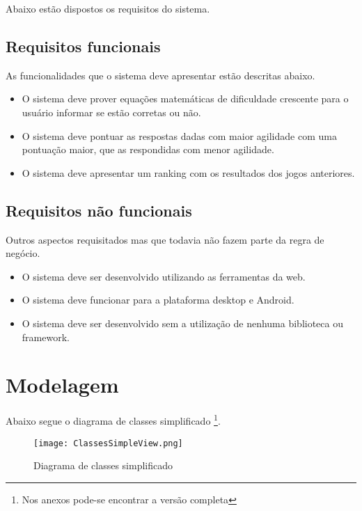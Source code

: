 Abaixo estão dispostos os requisitos do sistema.

\subsection{Requisitos funcionais}

As funcionalidades que o sistema deve apresentar estão descritas abaixo.

\begin{itemize}
    \item O sistema deve prover equações matemáticas de dificuldade crescente para o usuário informar se estão corretas ou não.
    \item O sistema deve pontuar as respostas dadas com maior agilidade com uma pontuação maior, que as respondidas com menor agilidade.
    \item O sistema deve apresentar um ranking com os resultados dos  jogos anteriores.
\end{itemize}

\subsection{Requisitos não funcionais}

Outros aspectos requisitados mas que todavia não fazem parte da regra de negócio.

\begin{itemize}
    \item O sistema deve ser desenvolvido utilizando as ferramentas da web.
    \item O sistema deve funcionar para a plataforma desktop e Android.
    \item O sistema deve ser desenvolvido sem a utilização de nenhuma biblioteca ou framework.
\end{itemize}

\section{Modelagem}

Abaixo segue o diagrama de classes simplificado \footnote{Nos anexos pode-se encontrar a versão completa}.

\begin{figure}
    \centering
    \texttt{[image: ClassesSimpleView.png]}
	\caption{Diagrama de classes simplificado}
\end{figure}

